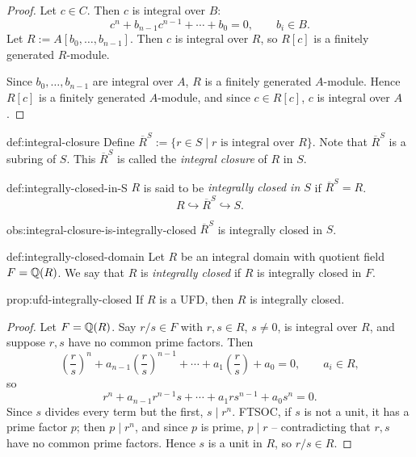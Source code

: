 \begin{proof}
Let $c \in C$. Then $c$ is integral over $B$:
\[
c^n + b_{n-1}c^{n-1} + \cdots + b_0 = 0, \qquad b_i \in B.
\]
Let $R := A[b_0,\ldots,b_{n-1}]$. Then $c$ is integral over $R$, so $R[c]$ is a finitely generated $R$-module.

Since $b_0,\ldots,b_{n-1}$ are integral over $A$, $R$ is a finitely generated $A$-module. Hence $R[c]$ is a finitely generated $A$-module, and since $c \in R[c]$, $c$ is integral over $A$.
\end{proof}

\begin{definition}{}{def:integral-closure}
Define $\overline{R}^S := \{ r \in S \mid r \text{ is integral over } R \}$. Note that $\overline{R}^S$ is a subring of $S$. This $\overline{R}^S$ is called the \emph{integral closure} of $R$ in $S$.
\end{definition}

\begin{definition}{}{def:integrally-closed-in-S}
$R$ is said to be \emph{integrally closed in $S$} if $\overline{R}^S = R$.
\[
R \hookrightarrow \overline{R}^S \hookrightarrow S.
\]
\end{definition}

\begin{observation}{}{obs:integral-closure-is-integrally-closed}
$\overline{R}^S$ is integrally closed in $S$.
\end{observation}

\begin{definition}{}{def:integrally-closed-domain}
Let $R$ be an integral domain with quotient field $F = \mathbb{Q}(R)$. We say that $R$ is \emph{integrally closed} if $R$ is integrally closed in $F$.
\end{definition}

\begin{proposition}{}{prop:ufd-integrally-closed}
If $R$ is a UFD, then $R$ is integrally closed.
\end{proposition}

\begin{proof}
Let $F = \mathbb{Q}(R)$. Say $r/s \in F$ with $r,s \in R$, $s \neq 0$, is integral over $R$, and suppose $r,s$ have no common prime factors. Then
\[
\left(\frac rs\right)^n + a_{n-1}\left(\frac rs\right)^{n-1} + \cdots + a_1 \left(\frac rs\right) + a_0 = 0, \qquad a_i \in R,
\]
so
\[
r^n + a_{n-1} r^{n-1} s + \cdots + a_1 r s^{n-1} + a_0 s^n = 0.
\]
Since $s$ divides every term but the first, $s \mid r^n$. FTSOC, if $s$ is not a unit, it has a prime factor $p$; then $p \mid r^n$, and since $p$ is prime, $p \mid r$ -- contradicting that $r,s$ have no common prime factors. Hence $s$ is a unit in $R$, so $r/s \in R$.
\end{proof}


